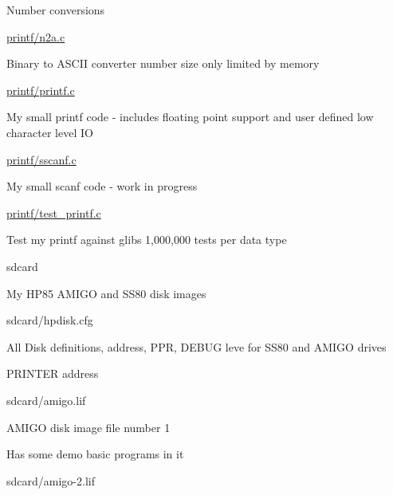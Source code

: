 \begin{DoxyItemize}
\begin{DoxyItemize}
\begin{DoxyItemize}
\item Number conversions
\end{DoxyItemize}
\item \hyperlink{n2a_8c}{printf/n2a.\+c}
\begin{DoxyItemize}
\item Binary to A\+S\+C\+II converter number size only limited by memory
\end{DoxyItemize}
\item \hyperlink{printf_8c}{printf/printf.\+c}
\begin{DoxyItemize}
\item My small printf code -\/ includes floating point support and user defined low character level IO
\end{DoxyItemize}
\item \hyperlink{sscanf_8c}{printf/sscanf.\+c}
\begin{DoxyItemize}
\item My small scanf code -\/ work in progress
\end{DoxyItemize}
\item \hyperlink{test__printf_8c}{printf/test\+\_\+printf.\+c}
\begin{DoxyItemize}
\item Test my printf against glibs 1,000,000 tests per data type
\end{DoxyItemize}
\end{DoxyItemize}
\item sdcard
\begin{DoxyItemize}
\item My H\+P85 A\+M\+I\+GO and S\+S80 disk images
\begin{DoxyItemize}
\item sdcard/hpdisk.\+cfg
\begin{DoxyItemize}
\item All Disk definitions, address, P\+PR, D\+E\+B\+UG leve for S\+S80 and A\+M\+I\+GO drives
\item P\+R\+I\+N\+T\+ER address
\end{DoxyItemize}
\item sdcard/amigo.\+lif
\begin{DoxyItemize}
\item A\+M\+I\+GO disk image file number 1
\item Has some demo basic programs in it
\end{DoxyItemize}
\item sdcard/amigo-\/2.\+lif
\begin{DoxyItemize}

\end{DoxyItemize}
\end{DoxyItemize}
\end{DoxyItemize}
\end{DoxyItemize}
